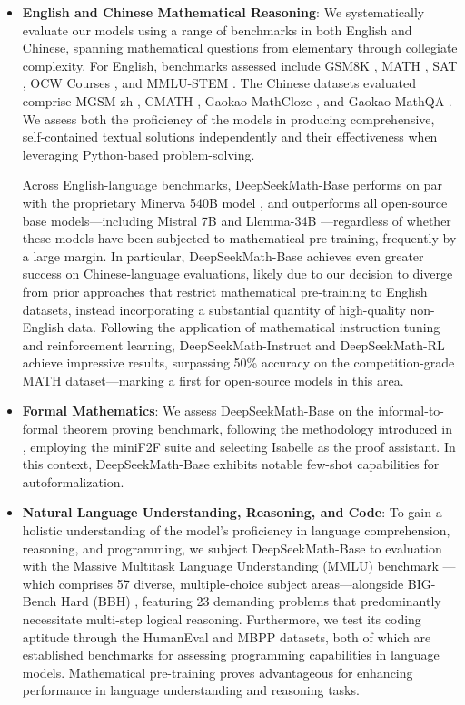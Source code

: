 \begin{itemize}[topsep=0pt]
    \item \textbf{English and Chinese Mathematical Reasoning}: We systematically evaluate our models using a range of benchmarks in both English and Chinese, spanning mathematical questions from elementary through collegiate complexity. For English, benchmarks assessed include GSM8K \citep{gsm8k}, MATH \citep{MATH}, SAT \citep{llemma}, OCW Courses \citep{minerva}, and MMLU-STEM \citep{mmlu}. The Chinese datasets evaluated comprise MGSM-zh \citep{mgsm}, CMATH \citep{wei2023cmath}, Gaokao-MathCloze \citep{agieval}, and Gaokao-MathQA \citep{agieval}. We assess both the proficiency of the models in producing comprehensive, self-contained textual solutions independently and their effectiveness when leveraging Python-based problem-solving.

Across English-language benchmarks, DeepSeekMath-Base performs on par with the proprietary Minerva 540B model \citep{minerva}, and outperforms all open-source base models—including Mistral 7B \citep{mistral} and Llemma-34B \citep{llemma}—regardless of whether these models have been subjected to mathematical pre-training, frequently by a large margin. In particular, DeepSeekMath-Base achieves even greater success on Chinese-language evaluations, likely due to our decision to diverge from prior approaches \citep{minerva,llemma} that restrict mathematical pre-training to English datasets, instead incorporating a substantial quantity of high-quality non-English data. Following the application of mathematical instruction tuning and reinforcement learning, DeepSeekMath-Instruct and DeepSeekMath-RL achieve impressive results, surpassing 50\% accuracy on the competition-grade MATH dataset—marking a first for open-source models in this area.

\item \textbf{Formal Mathematics}: We assess DeepSeekMath-Base on the informal-to-formal theorem proving benchmark, following the methodology introduced in \citep{dsp_proof}, employing the miniF2F \citep{minif2f} suite and selecting Isabelle \citep{isabelle} as the proof assistant. In this context, DeepSeekMath-Base exhibits notable few-shot capabilities for autoformalization.
\item \textbf{Natural Language Understanding, Reasoning, and Code}: To gain a holistic understanding of the model's proficiency in language comprehension, reasoning, and programming, we subject DeepSeekMath-Base to evaluation with the Massive Multitask Language Understanding (MMLU) benchmark \citep{mmlu}—which comprises 57 diverse, multiple-choice subject areas—alongside BIG-Bench Hard (BBH) \citep{bbh}, featuring 23 demanding problems that predominantly necessitate multi-step logical reasoning. Furthermore, we test its coding aptitude through the HumanEval \citep{codex} and MBPP \citep{mbpp} datasets, both of which are established benchmarks for assessing programming capabilities in language models. Mathematical pre-training proves advantageous for enhancing performance in language understanding and reasoning tasks.


\end{itemize}
